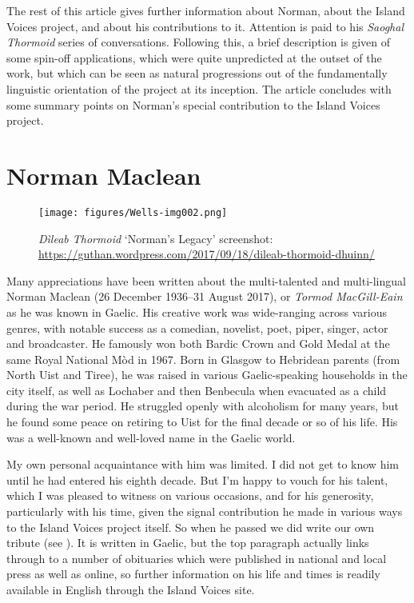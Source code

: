 \documentclass[output=paper,colorlinks,citecolor=brown]{langscibook}
\begin{document}
The rest of this article gives further information about Norman, about the Island Voices project, and about his contributions to it. Attention is paid to his \textit{Saoghal Thormoid} series of conversations. Following this, a brief description is given of some spin-off applications, which were quite unpredicted at the outset of the work, but which can be seen as natural progressions out of the fundamentally linguistic orientation of the project at its inception. The article concludes with some summary points on Norman’s special contribution to the Island Voices project.

\section{Norman Maclean}

\begin{figure}[t]
    \texttt{[image: figures/Wells-img002.png]}
    \caption{\textit{Dìleab Thormoid} `Norman’s Legacy' screenshot: \url{https://guthan.wordpress.com/2017/09/18/dileab-thormoid-dhuinn/}}
    \label{fig:wells:1}
\end{figure}

Many appreciations have been written about the multi\hyp talented and multi\hyp lingual Norman Maclean (26 December 1936–31 August 2017), or \textit{Tormod MacGill-Eain} as he was known in Gaelic. His creative work was wide-ranging across various genres, with notable success as a comedian, novelist, poet, piper, singer, actor and broadcaster. He famously won both Bardic Crown and Gold Medal at the same Royal National Mòd in 1967. Born in Glasgow to Hebridean parents (from North Uist and Tiree), he was raised in various Gaelic-speaking households in the city itself, as well as Lochaber and then Benbecula when evacuated as a child during the war period. He struggled openly with alcoholism for many years, but he found some peace on retiring to Uist for the final decade or so of his life. His was a well-known and well-loved name in the Gaelic world.

My own personal acquaintance with him was limited. I did not get to know him until he had entered his eighth decade. But I’m happy to vouch for his talent, which I was pleased to witness on various occasions, and for his generosity, particularly with his time, given the signal contribution he made in various ways to the Island Voices project itself. So when he passed we did write our own tribute (see ). It is written in Gaelic, but the top paragraph actually links through to a number of obituaries which were published in national and local press as well as online, so further information on his life and times is readily available in English through the Island Voices site.
\end{document}
